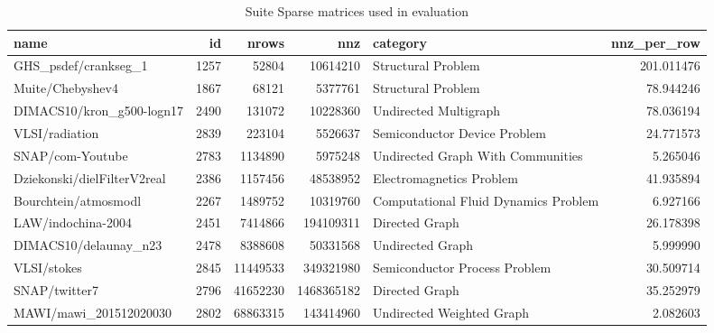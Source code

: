 
\begin{table}[t]
\centering
\caption{Suite Sparse matrices used in evaluation}
\label{tab:suite_sparse_matrices}
\begin{tabular}{lrrrlr}
\toprule
name & id & nrows & nnz & category & nnz\_per\_row \\
\midrule
GHS\_psdef/crankseg\_1 & 1257 & 52804 & 10614210 & Structural Problem & 201.011476 \\
Muite/Chebyshev4 & 1867 & 68121 & 5377761 & Structural Problem & 78.944246 \\
DIMACS10/kron\_g500-logn17 & 2490 & 131072 & 10228360 & Undirected Multigraph & 78.036194 \\
VLSI/radiation & 2839 & 223104 & 5526637 & Semiconductor Device Problem & 24.771573 \\
SNAP/com-Youtube & 2783 & 1134890 & 5975248 & Undirected Graph With Communities & 5.265046 \\
Dziekonski/dielFilterV2real & 2386 & 1157456 & 48538952 & Electromagnetics Problem & 41.935894 \\
Bourchtein/atmosmodl & 2267 & 1489752 & 10319760 & Computational Fluid Dynamics Problem & 6.927166 \\
LAW/indochina-2004 & 2451 & 7414866 & 194109311 & Directed Graph & 26.178398 \\
DIMACS10/delaunay\_n23 & 2478 & 8388608 & 50331568 & Undirected Graph & 5.999990 \\
VLSI/stokes & 2845 & 11449533 & 349321980 & Semiconductor Process Problem & 30.509714 \\
SNAP/twitter7 & 2796 & 41652230 & 1468365182 & Directed Graph & 35.252979 \\
MAWI/mawi\_201512020030 & 2802 & 68863315 & 143414960 & Undirected Weighted Graph & 2.082603 \\
\bottomrule
\end{tabular}

\end{table}
